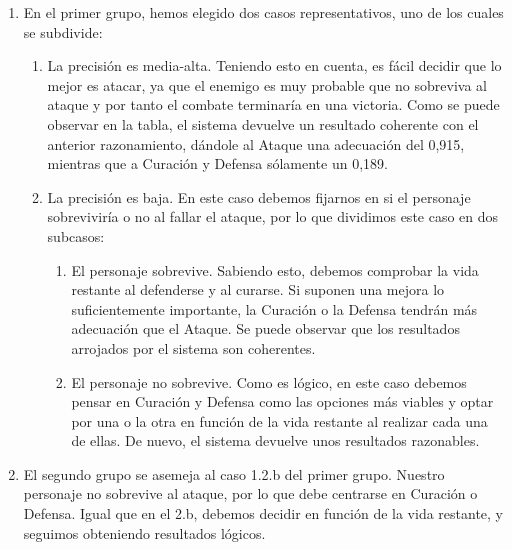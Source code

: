 \begin{enumerate}
	
	\item En el primer grupo, hemos elegido dos casos representativos, uno de los cuales se subdivide:
	\begin{enumerate}[label={1.\arabic*.}]
		\item La precisión es media-alta. Teniendo esto en cuenta, es fácil decidir que lo mejor es atacar, ya que el enemigo es muy probable que no sobreviva al ataque y por tanto el combate terminaría en una victoria. Como se puede observar en la tabla, el sistema devuelve un resultado coherente con el anterior razonamiento, dándole al Ataque una adecuación del 0,915, mientras que a Curación y Defensa sólamente un 0,189.
		\item La precisión es baja. En este caso debemos fijarnos en si el personaje sobreviviría o no al fallar el ataque, por lo que dividimos este caso en dos subcasos:
		\begin{enumerate}[label=\alph*)]
			\item El personaje sobrevive. Sabiendo esto, debemos comprobar la vida restante al defenderse y al curarse. Si suponen una mejora lo suficientemente importante, la Curación o la Defensa tendrán más adecuación que el Ataque. Se puede observar que los resultados arrojados por el sistema son coherentes.
			\item El personaje no sobrevive. Como es lógico, en este caso debemos pensar en Curación y Defensa como las opciones más viables y optar por una o la otra en función de la vida restante al realizar cada una de ellas. De nuevo, el sistema devuelve unos resultados razonables.
		\end{enumerate}
	\end{enumerate}
\item El segundo grupo se asemeja al caso 1.2.b del primer grupo. Nuestro personaje no sobrevive al ataque, por lo que debe centrarse en Curación o Defensa. Igual que en el 2.b, debemos decidir en función de la vida restante, y seguimos obteniendo resultados lógicos.


\end{enumerate}

